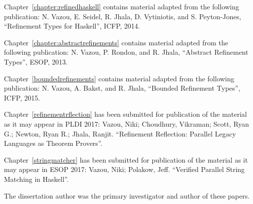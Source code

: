 Chapter~\ref{chapter:refinedhaskell} contains material adapted from the following publication:
\noindent N. Vazou, E. Seidel, R. Jhala, D. Vytiniotis, and S. Peyton-Jones,
``Refinement Types for Haskell'', 
ICFP, 2014.

Chapter~\ref{chapter:abstractrefinements} contains material adapted from the following publication:
\noindent N. Vazou, P. Rondon, and R. Jhala,
``Abstract Refinement Types'', 
ESOP, 2013.

Chapter~\ref{boundedrefinements} contains material adapted from the following publication:
\noindent N. Vazou, A. Bakst, and R. Jhala,
``Bounded Refinement Types'',
ICFP, 2015.


Chapter~\ref{refinementrflection} has been submitted for publication of the material as it may appear in PLDI 2017:
\noindent Vazou, Niki; Choudhury, Vikraman; Scott, Ryan G.; Newton, Ryan R.; Jhala, Ranjit.
``Refinement Reflection: Parallel Legacy Languages as Theorem Provers''.

Chapter~\ref{stringmatcher} has been submitted for publication of the material as it may appear in ESOP 2017:
\noindent Vazou, Niki; Polakow, Jeff.
``Verified Parallel String Matching in Haskell''.

The dissertation author was the primary investigator and author of these papers.